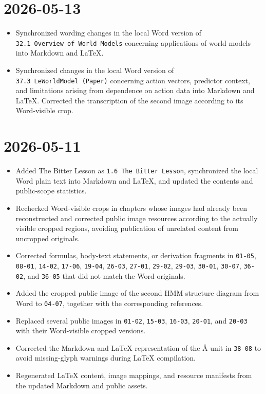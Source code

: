 \hypertarget{section-4}{%
\section{2026-05-13}\label{section-4}}

\begin{itemize}
\tightlist
\item
  Synchronized wording changes in the local Word version of \texttt{32.1\ Overview\ of\ World\ Models} concerning applications of world models into Markdown and LaTeX.
\item
  Synchronized changes in the local Word version of \texttt{37.3\ LeWorldModel\ (Paper)} concerning action vectors, predictor context, and limitations arising from dependence on action data into Markdown and LaTeX. Corrected the transcription of the second image according to its Word-visible crop.
\end{itemize}

\hypertarget{section-5}{%
\section{2026-05-11}\label{section-5}}

\begin{itemize}
\tightlist
\item
  Added The Bitter Lesson as \texttt{1.6\ The\ Bitter\ Lesson}, synchronized the local Word plain text into Markdown and LaTeX, and updated the contents and public-scope statistics.
\item
  Rechecked Word-visible crops in chapters whose images had already been reconstructed and corrected public image resources according to the actually visible cropped regions, avoiding publication of unrelated content from uncropped originals.
\item
  Corrected formulas, body-text statements, or derivation fragments in \texttt{01-05}, \texttt{08-01}, \texttt{14-02}, \texttt{17-06}, \texttt{19-04}, \texttt{26-03}, \texttt{27-01}, \texttt{29-02}, \texttt{29-03}, \texttt{30-01}, \texttt{30-07}, \texttt{36-02}, and \texttt{36-05} that did not match the Word originals.
\item
  Added the cropped public image of the second HMM structure diagram from Word to \texttt{04-07}, together with the corresponding references.
\item
  Replaced several public images in \texttt{01-02}, \texttt{15-03}, \texttt{16-03}, \texttt{20-01}, and \texttt{20-03} with their Word-visible cropped versions.
\item
  Corrected the Markdown and LaTeX representation of the Å unit in \texttt{38-08} to avoid missing-glyph warnings during LaTeX compilation.
\item
  Regenerated LaTeX content, image mappings, and resource manifests from the updated Markdown and public assets.
\end{itemize}

